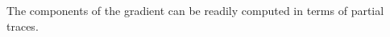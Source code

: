 \documentclass[aos]{imsart}
\theoremstyle{definition}
\numberwithin{equation}{section}
\DeclareMathOperator{\tr}{Tr}
\DeclarePairedDelimiter{\norm}{\lVert}{\rVert}
\newcommand{\ot}{\otimes}
\newcommand{\MW}[1]{{\color{red}[MW: #1]}}
\newcommand{\MW}[1]{{}}
\begin{document}
The components of the gradient can be readily computed in terms of partial traces.

\end{document}
